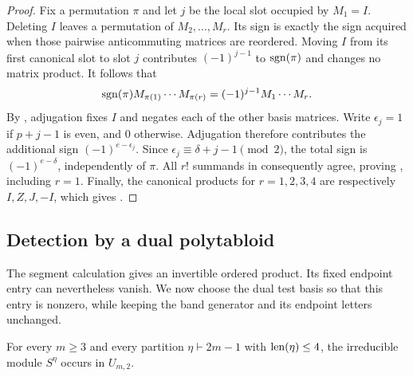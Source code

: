 \begin{proof}
Fix a permutation $\pi$ and let $j$ be the local slot occupied by $M_1=I$.
Deleting $I$ leaves a permutation of $M_2,\ldots,M_r$.
Its sign is exactly the sign acquired when those pairwise anticommuting
matrices are reordered. Moving $I$ from its first canonical slot to slot
$j$ contributes $(-1)^{j-1}$ to $\operatorname{sgn}(\pi)$ and changes no matrix product.
It follows that
\[
 \operatorname{sgn}(\pi)M_{\pi(1)}\cdots M_{\pi(r)}
       =(-1)^{j-1}M_1\cdots M_r.
\]
By , adjugation fixes $I$ and negates each of the
other basis matrices. Write $\epsilon_j=1$ if $p+j-1$ is even, and $0$
otherwise. Adjugation therefore contributes the additional sign
$(-1)^{e-\epsilon_j}$. Since
$\epsilon_j\equiv\delta+j-1\pmod2$, the total sign is
$(-1)^{e-\delta}$, independently of $\pi$. All $r!$ summands in
 consequently agree, proving
, including $r=1$.
Finally, the canonical products for $r=1,2,3,4$ are respectively
$I,Z,J,-I$, which gives .
\end{proof}

\subsection{Detection by a dual polytabloid}

The segment calculation gives an invertible ordered product. Its fixed
endpoint entry can nevertheless vanish. We now choose the dual test
basis so that this entry is nonzero, while keeping the band generator
and its endpoint letters unchanged.

\begin{proposition}\label{prop:two-band}
For every $m\geq3$ and every partition $\eta\vdash 2m-1$ with
$\operatorname{len}(\eta)\leq4$, the irreducible module $S^\eta$ occurs in $U_{m,2}$.
\end{proposition}

